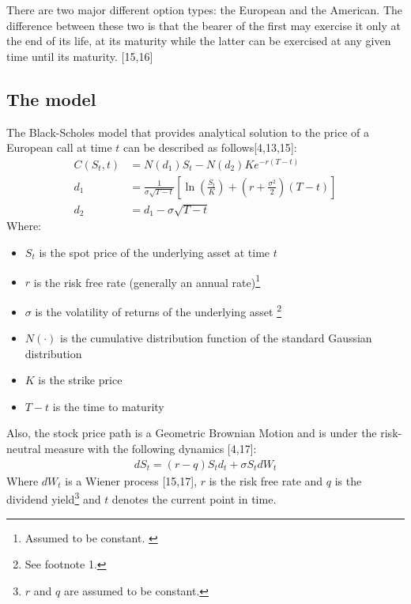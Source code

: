 \documentclass[12pt,twoside]{reedthesis}
\providecommand{\tightlist}{%
  \setlength{\itemsep}{0pt}\setlength{\parskip}{0pt}}
\theoremstyle{definition}
\theoremstyle{definition}
\theoremstyle{remark}
\begin{document}
  There are two major different option types: the European and the
  American. The difference between these two is that the bearer of the
  first may exercise it only at the end of its life, at its maturity while
  the latter can be exercised at any given time until its maturity.
  {[}15,16{]}
  
  \subsection{The model}\label{the-model}
  
  The Black-Scholes model that provides analytical solution to the price
  of a European call at time \(t\) can be described as
  follows{[}4,13,15{]}:
  \begin{align}
  C(S_{t},t)&=N(d_{1})S_{t}-N(d_{2})Ke^{-r(T-t)}\\[10pt]
  d_{1}&={\frac {1}{\sigma {\sqrt {T-t}}}}\left[\ln \left({\frac {S_{t}}{K}}\right)+\left(r+{\frac {\sigma ^{2}}{2}}\right)(T-t)\right]\\[10pt]
  d_{2}&=d_{1}-\sigma {\sqrt {T-t}}
  \end{align}
  \noindent
  Where:
  \begin{itemize}
  \tightlist
  \item
    \(S_{t}\) is the spot price of the underlying asset at time \(t\)
  \item
    \(r\) is the risk free rate (generally an annual
    rate)\footnote{Assumed to be constant. \label{teste}}
  \item
    \(\sigma\) is the volatility of returns of the underlying asset
    \footnote{See footnote 1.}
  \item
    \(N(\cdot )\) is the cumulative distribution function of the standard
    Gaussian distribution
  \item
    \(K\) is the strike price
  \item
    \(T-t\) is the time to maturity
  \end{itemize}
  \noindent
  Also, the stock price path is a Geometric Brownian Motion and is under
  the risk-neutral measure with the following dynamics {[}4,17{]}:
  \begin{align}
  dS_{t} = (r-q)S_td_t+\sigma S_t dW_t
  \end{align}
  \noindent
  Where \(dW_t\) is a Wiener process {[}15,17{]}, \(r\) is the risk free
  rate and \(q\) is the dividend
  yield\footnote{$r$ and $q$ are assumed to be constant.} and \(t\)
  denotes the current point in time.
  
\end{document}
